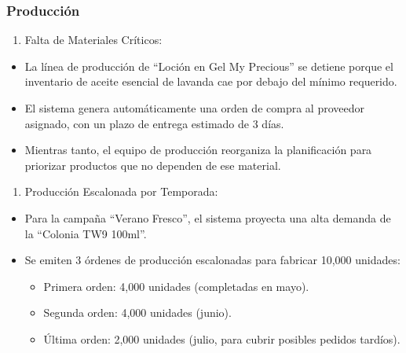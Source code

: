 \documentclass[
  letterpaper,
  DIV=11,
  numbers=noendperiod]{scrreprt}
\providecommand{\tightlist}{%
  \setlength{\itemsep}{0pt}\setlength{\parskip}{0pt}}\usepackage{longtable,booktabs,array}
\begin{document}
\subsubsection{Producción}\label{producciuxf3n-1}

\begin{enumerate}
\def\labelenumi{\arabic{enumi}.}
\tightlist
\item
  Falta de Materiales Críticos:
\end{enumerate}

\begin{itemize}
\tightlist
\item
  La línea de producción de ``Loción en Gel My Precious'' se detiene
  porque el inventario de aceite esencial de lavanda cae por debajo del
  mínimo requerido.
\item
  El sistema genera automáticamente una orden de compra al proveedor
  asignado, con un plazo de entrega estimado de 3 días.
\item
  Mientras tanto, el equipo de producción reorganiza la planificación
  para priorizar productos que no dependen de ese material.
\end{itemize}

\begin{enumerate}
\def\labelenumi{\arabic{enumi}.}
\setcounter{enumi}{1}
\tightlist
\item
  Producción Escalonada por Temporada:
\end{enumerate}

\begin{itemize}
\tightlist
\item
  Para la campaña ``Verano Fresco'', el sistema proyecta una alta
  demanda de la ``Colonia TW9 100ml''.
\item
  Se emiten 3 órdenes de producción escalonadas para fabricar 10,000
  unidades:

  \begin{itemize}
  \tightlist
  \item
    Primera orden: 4,000 unidades (completadas en mayo).
  \item
    Segunda orden: 4,000 unidades (junio).
  \item
    Última orden: 2,000 unidades (julio, para cubrir posibles pedidos
    tardíos).
  \end{itemize}
\end{itemize}
\end{document}
